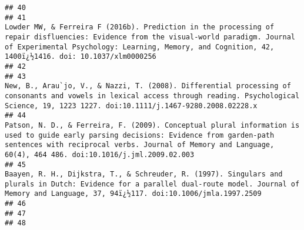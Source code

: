 \documentclass[
  english,
  man]{apa6}
\begin{document}
\begin{verbatim}
## 40                                                                                                                                                                                                                                                                                                                     
## 41                                                                         Lowder MW, & Ferreira F (2016b). Prediction in the processing of repair disfluencies: Evidence from the visual-world paradigm. Journal of Experimental Psychology: Learning, Memory, and Cognition, 42, 1400ï¿½1416. doi: 10.1037/xlm0000256
## 42                                                                                                                                                                                                                                                                                                                     
## 43                                                                                                             New, B., Arau`jo, V., & Nazzi, T. (2008). Differential processing of consonants and vowels in lexical access through reading. Psychological Science, 19, 1223 1227. doi:10.1111/j.1467-9280.2008.02228.x
## 44                                                               Patson, N. D., & Ferreira, F. (2009). Conceptual plural information is used to guide early parsing decisions: Evidence from garden-path sentences with reciprocal verbs. Journal of Memory and Language, 60(4), 464 486. doi:10.1016/j.jml.2009.02.003
## 45                                                                                                              Baayen, R. H., Dijkstra, T., & Schreuder, R. (1997). Singulars and plurals in Dutch: Evidence for a parallel dual-route model. Journal of Memory and Language, 37, 94ï¿½117. doi:10.1006/jmla.1997.2509
## 46                                                                                                                                                                                                                                                                                                                     
## 47                                                                                                                                                                                                                                                                                                                     
## 48                                                                                                                                                                                                                                                                                                                     

\end{verbatim}
\end{document}

